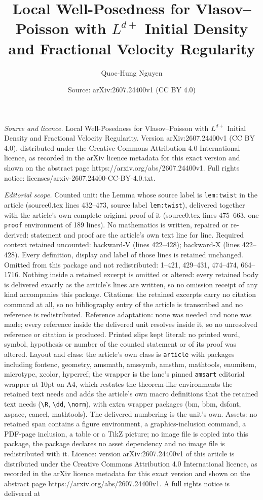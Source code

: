 \documentclass[10pt,a4paper]{amsart}
\title[Local Well-Posedness for Vlasov--Poisson with $L^{d+}$ Initi]{Local Well-Posedness for Vlasov--Poisson with $L^{d+}$ Initial Density and Fractional Velocity Regularity}
\author{Quoc-Hung Nguyen}
\date{Source: arXiv:2607.24400v1 (CC BY 4.0)}
\begin{document}
\maketitle

\noindent\emph{Source and licence.} Local Well-Posedness for Vlasov--Poisson with $L^{d+}$ Initial Density and Fractional Velocity Regularity. Version arXiv:2607.24400v1 (CC BY 4.0), distributed under the Creative Commons Attribution 4.0 International licence, as recorded in the arXiv licence metadata for this exact version and shown on the abstract page https://arxiv.org/abs/2607.24400v1. Full rights notice: licenses/arxiv-2607.24400-CC-BY-4.0.txt.\par\smallskip

\noindent\textit{Editorial scope.} Counted unit: the Lemma whose source label is \texttt{lem:twist} in the article (source0.tex lines 432--473, source label \texttt{lem:twist}), delivered together with the article's own complete original proof of it (source0.tex lines 475--663, one \texttt{proof} environment of 189 lines). No mathematics is written, repaired or re-derived: statement and proof are the article's own text line for line. Required context retained uncounted: backward-V (lines 422--428); backward-X (lines 422--428). Every definition, display and label of those lines is retained unchanged. Omitted from this package and not redistributed: 1--421, 429--431, 474--474, 664--1716. Nothing inside a retained excerpt is omitted or altered: every retained body is delivered exactly as the article's lines are written, so no omission receipt of any kind accompanies this package. Citations: the retained excerpts carry no citation command at all, so no bibliography entry of the article is transcribed and no reference is redistributed. Reference adaptation: none was needed and none was made; every reference inside the delivered unit resolves inside it, so no unresolved reference or citation is produced. Printed slips kept literal: no printed word, symbol, hypothesis or number of the counted statement or of its proof was altered. Layout and class: the article's own class is \texttt{article} with packages including fontenc, geometry, amsmath, amssymb, amsthm, mathtools, enumitem, microtype, xcolor, hyperref; the wrapper is the lane's pinned \texttt{amsart} editorial wrapper at 10pt on A4, which restates the theorem-like environments the retained text needs and adds the article's own macro definitions that the retained text needs (\texttt{\textbackslash R}, \texttt{\textbackslash dd}, \texttt{\textbackslash norm}), with extra wrapper packages (bm, bbm, dsfont, xspace, cancel, mathtools). The delivered numbering is the unit's own. Assets: no retained span contains a figure environment, a graphics-inclusion command, a PDF-page inclusion, a table or a TikZ picture; no image file is copied into this package, the package declares no asset dependency and no image file is redistributed with it. Licence: version arXiv:2607.24400v1 of this article is distributed under the Creative Commons Attribution 4.0 International licence, as recorded in the arXiv licence metadata for this exact version and shown on the abstract page https://arxiv.org/abs/2607.24400v1. A full rights notice is delivered at 
\end{document}
